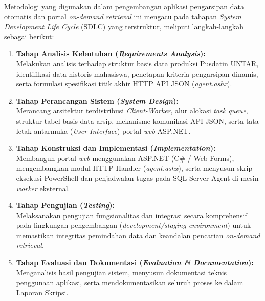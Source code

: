 Metodologi yang digunakan dalam pengembangan aplikasi pengarsipan data otomatis dan portal \textit{on-demand retrieval} ini mengacu pada tahapan \textit{System Development Life Cycle} (SDLC) yang terstruktur, meliputi langkah-langkah sebagai berikut:

\begin{enumerate}
    \item \textbf{Tahap Analisis Kebutuhan (\textit{Requirements Analysis}):}
    \\ Melakukan analisis terhadap struktur basis data produksi Pusdatin UNTAR, identifikasi data historis mahasiswa, penetapan kriteria pengarsipan dinamis, serta formulasi spesifikasi titik akhir HTTP API JSON (\textit{agent.ashx}).

    \item \textbf{Tahap Perancangan Sistem (\textit{System Design}):}
    \\ Merancang arsitektur terdistribusi \textit{Client-Worker}, alur alokasi \textit{task queue}, struktur tabel basis data arsip, mekanisme komunikasi API JSON, serta tata letak antarmuka (\textit{User Interface}) portal \textit{web} ASP.NET.

    \item \textbf{Tahap Konstruksi dan Implementasi (\textit{Implementation}):}
    \\ Membangun portal \textit{web} menggunakan ASP.NET (C\# / Web Forms), mengembangkan modul HTTP Handler (\textit{agent.ashx}), serta menyusun skrip eksekusi PowerShell dan penjadwalan tugas pada SQL Server Agent di mesin \textit{worker} eksternal.

    \item \textbf{Tahap Pengujian (\textit{Testing}):}
    \\ Melaksanakan pengujian fungsionalitas dan integrasi secara komprehensif pada lingkungan pengembangan (\textit{development/staging environment}) untuk memastikan integritas pemindahan data dan keandalan pencarian \textit{on-demand retrieval}.

    \item \textbf{Tahap Evaluasi dan Dokumentasi (\textit{Evaluation \& Documentation}):}
    \\ Menganalisis hasil pengujian sistem, menyusun dokumentasi teknis penggunaan aplikasi, serta mendokumentasikan seluruh proses ke dalam Laporan Skripsi.
\end{enumerate}